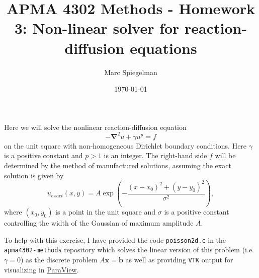 \documentclass[11pt]{article}
\begin{document}
\lstset{basicstyle=\ttfamily}

\title{APMA 4302 Methods - Homework 3: Non-linear solver for reaction-diffusion equations}
\author{Marc Spiegelman}
\date{\today}
\maketitle

Here we will solve the nonlinear reaction-diffusion equation
\begin{displaymath}
  -\mathbf{\nabla}^2 u + \gamma u^p = f
\end{displaymath}
on the unit square with  non-homogeneous Dirichlet boundary conditions. Here $\gamma$ is a positive constant and $p>1$ is an integer. The right-hand side $f$ will be determined by the method of manufactured solutions, assuming the exact solution is given by
\begin{displaymath}
  u_{exact}(x,y) = A \exp\left(-\frac{(x-x_0)^2+(y-y_0)^2}{\sigma^2}\right),
\end{displaymath}
where $(x_0,y_0)$ is a point in the unit square and $\sigma$ is a positive constant controlling the width of the Gaussian of maximum amplitude $A$.

To help with this exercise, I have provided the code \texttt{poisson2d.c} in the \texttt{apma4302-methods} repository which solves the linear version of this problem (i.e. $\gamma=0$) as the discrete problem $A\mathbf{x}=\mathbf{b}$ as well as providing \texttt{VTK} output for visualizing in \href{https://www.paraview.org/}{ParaView}.
\end{document}
